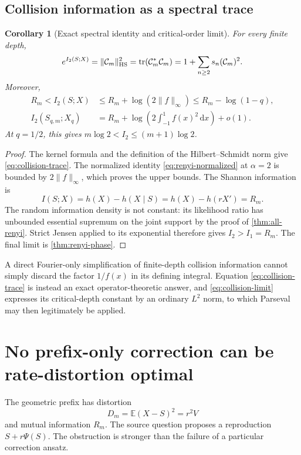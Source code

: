 \documentclass[11pt,a4paper]{article}
\numberwithin{equation}{section}
\newtheorem{corollary}[theorem]{Corollary}
\theoremstyle{definition}\newtheorem{definition}[theorem]{Definition}
\theoremstyle{remark}\newtheorem{remark}[theorem]{Remark}
\newcommand{\E}{\mathbb E}\newcommand{\Pp}{\mathbb P}
\newcommand{\dd}{\,\mathrm d}\newcommand{\ii}{\mathrm i}
\newcommand{\calC}{\mathcal C_m}\newcommand{\calP}{\mathcal P}
\newcommand{\norm}[1]{\lVert #1\rVert}
\begin{document}
\subsection{Collision information as a spectral trace}
\begin{corollary}[Exact spectral identity and critical-order limit]
\label{cor:collision}
For every finite depth,
\begin{equation}
 e^{I_2(S;X)}=\norm{\calC}_\HS^2
 =\operatorname{tr}(\calC^*\calC)
 =1+\sum_{n\ge2}s_n(\calC)^2.
 \label{eq:collision-trace}
\end{equation}
Moreover,
\begin{align}
 R_m<I_2(S;X)&\le R_m+\log(2\norm f_\infty)
 \le R_m-\log(1-q),\label{eq:collision-bounds}\\
 I_2(S_{q,m};X_q)&=R_m+\log\left(2\int_{-1}^{1}f(x)^2\dd x\right)+o(1).
 \label{eq:collision-limit}
\end{align}
At $q=1/2$, this gives $m\log2<I_2\le(m+1)\log2$.
\end{corollary}
\begin{proof}
The kernel formula and the definition of the Hilbert--Schmidt norm give \eqref{eq:collision-trace}. The normalized identity \eqref{eq:renyi-normalized} at $\alpha=2$ is bounded by $2\norm f_\infty$, which proves the upper bounds. The Shannon information is
\[
 I(S;X)=h(X)-h(X\mid S)=h(X)-h(rX')=R_m.
\]
The random information density is not constant: its likelihood ratio has unbounded essential supremum on the joint support by the proof of \cref{thm:all-renyi}. Strict Jensen applied to its exponential therefore gives $I_2>I_1=R_m$. The final limit is \cref{thm:renyi-phase}.
\end{proof}
A direct Fourier-only simplification of finite-depth collision information cannot simply discard the factor $1/f(x)$ in its defining integral. Equation \eqref{eq:collision-trace} is instead an exact operator-theoretic answer, and \eqref{eq:collision-limit} expresses its critical-depth constant by an ordinary $L^2$ norm, to which Parseval may then legitimately be applied.

\section{No prefix-only correction can be rate-distortion optimal}
\label{sec:RD}
The geometric prefix has distortion
\begin{equation}
 D_m=\E(X-S)^2=r^2V
 \label{eq:Dm}
\end{equation}
and mutual information $R_m$. The source question proposes a reproduction $S+r\Psi(S)$. The obstruction is stronger than the failure of a particular correction ansatz.
\end{document}
